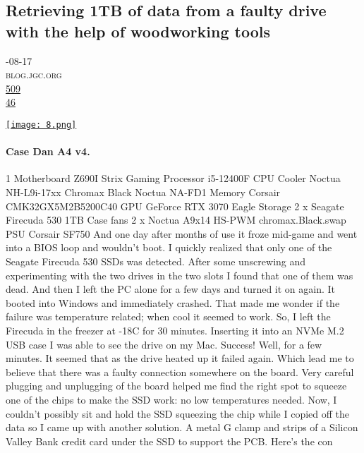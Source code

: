 \documentclass[10pt,a4paper]{article}
\begin{document}
\subsection{Retrieving 1TB of data from a faulty drive with the help of woodworking tools}
\noindent\begin{minipage}[t]{0.20\linewidth}
\vspace{0pt}
\noindent\textsc{\footnotesize
{\scriptsize\faCalendar}-08-17 \\
{\scriptsize\faGlobe}\space 
blog.jgc.org \\
{\scriptsize\faThumbsOUp}\space 
\href{http://news.ycombinator.com/item?id=37160783\&utm\_term=comment}{509} \\
{\scriptsize\faComments}\space 
\href{http://news.ycombinator.com/item?id=37160783\&utm\_term=comment}{46} \\
}
\end{minipage} %
\begin{minipage}[t]{0.80\linewidth}
\vspace{0pt}
\begin{multicols}{2}

    \href{https://blog.jgc.org/2023/08/retrieving-1tb-of-data-from-faulty.html?utm\_source=hackernewsletter\&utm\_medium=email\&utm\_term=fav}{
        \texttt{[image: 8.png]}
    }
  
\paragraph{Case Dan A4 v4.}
1
Motherboard Z690I Strix Gaming
Processor i5-12400F
CPU Cooler Noctua NH-L9i-17xx Chromax Black
Noctua NA-FD1
Memory Corsair CMK32GX5M2B5200C40
GPU GeForce RTX 3070 Eagle
Storage 2 x Seagate Firecuda 530 1TB
Case fans 2 x Noctua A9x14 HS-PWM chromax.Black.swap
PSU Corsair SF750
And one day after months of use it froze mid-game and went into a BIOS loop and wouldn't boot. I quickly realized that only one of the Seagate Firecuda 530 SSDs was detected. After some unscrewing and experimenting with the two drives in the two slots I found that one of them was dead.
And then I left the PC alone for a few days and turned it on again. It booted into Windows and immediately crashed.
That made me wonder if the failure was temperature related; when cool it seemed to work. So, I left the Firecuda in the freezer at -18C for 30 minutes. Inserting it into an NVMe M.2 USB case I was able to see the drive on my Mac. Success!
Well, for a few minutes. It seemed that as the drive heated up it failed again. Which lead me to believe that there was a faulty connection somewhere on the board. Very careful plugging and unplugging of the board helped me find the right spot to squeeze one of the chips to make the SSD work: no low temperatures needed.
Now, I couldn't possibly sit and hold the SSD squeezing the chip while I copied off the data so I came up with another solution. A metal G clamp and strips of a Silicon Valley Bank credit card under the SSD to support the PCB.
Here's the con

\end{multicols}
\end{minipage}
\end{document}
